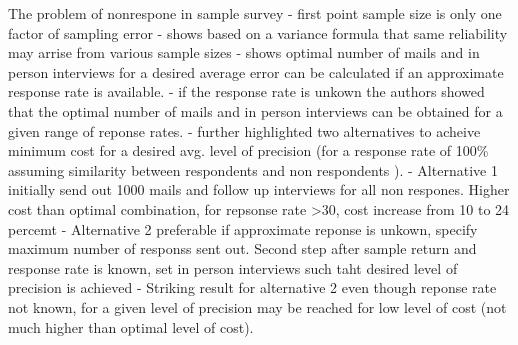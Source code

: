 The problem of nonrespone in sample survey
- first point sample size is only one factor of sampling error
- shows based on a variance formula that same reliability may arrise from various sample sizes
- shows optimal number of mails and in person interviews for a desired average error can be calculated if an approximate response rate is available.
- if the response rate is unkown the authors showed that the optimal number of mails and in person interviews can be obtained for a given range of reponse rates.
-  further highlighted two alternatives to acheive minimum cost for a desired avg. level of precision (for a response rate of 100\% assuming similarity between respondents and non respondents ).
- Alternative 1 initially send out 1000 mails and follow up interviews for all non respones.  Higher cost than optimal combination, for repsonse rate >30, cost increase from 10 to 24 percemt
- Alternative 2 preferable if approximate reponse is unkown, specify maximum number of responss sent out. Second step after sample return and response rate is known, set in person interviews such taht desired level of precision is achieved
- Striking result for alternative 2 even though reponse rate not known, for a given level of precision may be reached for low level of cost (not much higher than optimal level of cost). 
\endinput
